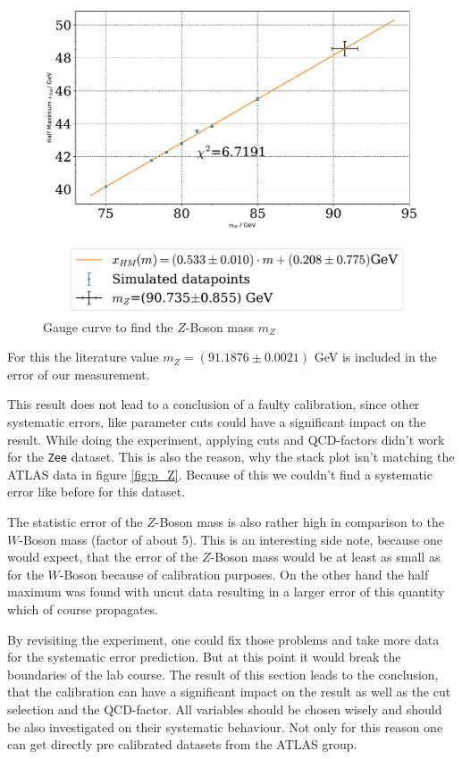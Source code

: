 \documentclass[11pt,a4paper,notitlepage]{scrartcl}
\begin{document}
\begin{figure}[h]
	\centering
	\includegraphics[width=0.7\linewidth]{P1_pics/gauge_results/Zee.pdf}
	\caption{Gauge curve to find the $Z$-Boson mass $m_Z$}\label{fig:m_Z}
\end{figure} 

For this the literature value $m_Z=(91.1876\pm 0.0021)$ GeV is included in the error of our measurement. 

This result does not lead to a conclusion of a faulty calibration, since other systematic errors, like parameter cuts could have a significant impact on the result. While doing the experiment, applying cuts and QCD-factors didn't work for the \texttt{Zee} dataset. This is also the reason, why the stack plot isn't matching the ATLAS data in figure \ref{fig:p_Z}. Because of this we couldn't find a systematic error like before for this dataset. 

The statistic error of the $Z$-Boson mass is also rather high in comparison to the $W$-Boson mass (factor of about 5). This is an interesting side note, because one would expect, that the error of the $Z$-Boson mass would be at least as small as for the $W$-Boson because of calibration purposes. On the other hand the half maximum was found with uncut data resulting in a larger error of this quantity which of course propagates.

By revisiting the experiment, one could fix those problems and take more data for the systematic error prediction. But at this point it would break the boundaries of the lab course. The result of this section leads to the conclusion, that the calibration can have a significant impact on the result as well as the cut selection and the QCD-factor. All variables should be chosen wisely and should be also investigated on their systematic behaviour. Not only for this reason one can get directly pre calibrated datasets from the ATLAS group.
\end{document}
